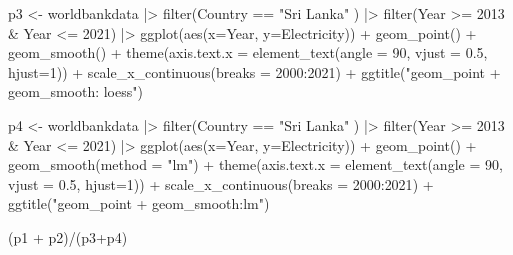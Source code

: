 \documentclass[
  letterpaper,
  DIV=11,
  numbers=noendperiod]{scrreprt}
\newenvironment{Shaded}{\begin{snugshade}}{\end{snugshade}}
\newcommand{\AttributeTok}[1]{\textcolor[rgb]{0.40,0.45,0.13}{#1}}
\newcommand{\DecValTok}[1]{\textcolor[rgb]{0.68,0.00,0.00}{#1}}
\newcommand{\FloatTok}[1]{\textcolor[rgb]{0.68,0.00,0.00}{#1}}
\newcommand{\FunctionTok}[1]{\textcolor[rgb]{0.28,0.35,0.67}{#1}}
\newcommand{\NormalTok}[1]{\textcolor[rgb]{0.00,0.23,0.31}{#1}}
\newcommand{\OtherTok}[1]{\textcolor[rgb]{0.00,0.23,0.31}{#1}}
\newcommand{\SpecialCharTok}[1]{\textcolor[rgb]{0.37,0.37,0.37}{#1}}
\newcommand{\StringTok}[1]{\textcolor[rgb]{0.13,0.47,0.30}{#1}}
\begin{document}
\begin{Shaded}
\begin{Highlighting}[]
\NormalTok{p3 }\OtherTok{\textless{}{-}}\NormalTok{ worldbankdata }\SpecialCharTok{|\textgreater{}}
  \FunctionTok{filter}\NormalTok{(Country }\SpecialCharTok{==} \StringTok{"Sri Lanka"}\NormalTok{ ) }\SpecialCharTok{|\textgreater{}} 
  \FunctionTok{filter}\NormalTok{(Year }\SpecialCharTok{\textgreater{}=} \DecValTok{2013} \SpecialCharTok{\&}\NormalTok{ Year }\SpecialCharTok{\textless{}=} \DecValTok{2021}\NormalTok{) }\SpecialCharTok{|\textgreater{}}
  \FunctionTok{ggplot}\NormalTok{(}\FunctionTok{aes}\NormalTok{(}\AttributeTok{x=}\NormalTok{Year, }\AttributeTok{y=}\NormalTok{Electricity)) }\SpecialCharTok{+} 
  \FunctionTok{geom\_point}\NormalTok{() }\SpecialCharTok{+}
  \FunctionTok{geom\_smooth}\NormalTok{() }\SpecialCharTok{+}
  \FunctionTok{theme}\NormalTok{(}\AttributeTok{axis.text.x =} \FunctionTok{element\_text}\NormalTok{(}\AttributeTok{angle =} \DecValTok{90}\NormalTok{, }\AttributeTok{vjust =} \FloatTok{0.5}\NormalTok{, }\AttributeTok{hjust=}\DecValTok{1}\NormalTok{)) }\SpecialCharTok{+} 
  \FunctionTok{scale\_x\_continuous}\NormalTok{(}\AttributeTok{breaks =} \DecValTok{2000}\SpecialCharTok{:}\DecValTok{2021}\NormalTok{)  }\SpecialCharTok{+} 
  \FunctionTok{ggtitle}\NormalTok{(}\StringTok{"geom\_point + geom\_smooth: loess"}\NormalTok{)}

\NormalTok{p4 }\OtherTok{\textless{}{-}}\NormalTok{ worldbankdata }\SpecialCharTok{|\textgreater{}} 
  \FunctionTok{filter}\NormalTok{(Country }\SpecialCharTok{==} \StringTok{"Sri Lanka"}\NormalTok{ ) }\SpecialCharTok{|\textgreater{}}
  \FunctionTok{filter}\NormalTok{(Year }\SpecialCharTok{\textgreater{}=} \DecValTok{2013} \SpecialCharTok{\&}\NormalTok{ Year }\SpecialCharTok{\textless{}=} \DecValTok{2021}\NormalTok{) }\SpecialCharTok{|\textgreater{}} 
  \FunctionTok{ggplot}\NormalTok{(}\FunctionTok{aes}\NormalTok{(}\AttributeTok{x=}\NormalTok{Year, }\AttributeTok{y=}\NormalTok{Electricity)) }\SpecialCharTok{+} 
  \FunctionTok{geom\_point}\NormalTok{() }\SpecialCharTok{+}
  \FunctionTok{geom\_smooth}\NormalTok{(}\AttributeTok{method =} \StringTok{"lm"}\NormalTok{) }\SpecialCharTok{+}
  \FunctionTok{theme}\NormalTok{(}\AttributeTok{axis.text.x =} \FunctionTok{element\_text}\NormalTok{(}\AttributeTok{angle =} \DecValTok{90}\NormalTok{, }\AttributeTok{vjust =} \FloatTok{0.5}\NormalTok{, }\AttributeTok{hjust=}\DecValTok{1}\NormalTok{)) }\SpecialCharTok{+} 
  \FunctionTok{scale\_x\_continuous}\NormalTok{(}\AttributeTok{breaks =} \DecValTok{2000}\SpecialCharTok{:}\DecValTok{2021}\NormalTok{)  }\SpecialCharTok{+} 
  \FunctionTok{ggtitle}\NormalTok{(}\StringTok{"geom\_point + geom\_smooth:lm"}\NormalTok{)}

\NormalTok{(p1 }\SpecialCharTok{+}\NormalTok{ p2)}\SpecialCharTok{/}\NormalTok{(p3}\SpecialCharTok{+}\NormalTok{p4)}
\end{Highlighting}
\end{Shaded}
\end{document}
